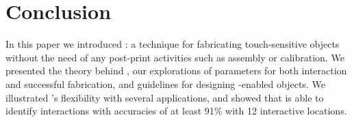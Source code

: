 	\section{Conclusion}
		In this paper we introduced \at: a technique for fabricating touch-sensitive
		objects without the need of any post-print activities such as assembly or
		calibration. We presented the theory behind \at, our explorations of
		parameters for both interaction and successful fabrication, and guidelines
		for designing \at-enabled objects. We illustrated \at's flexibility with
		several applications, and showed that \at is able to identify interactions
		with accuracies of at least 91\% with 12 interactive locations.
	
